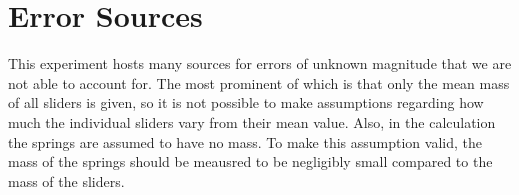 \section{Error Sources}
This experiment hosts many sources for errors of unknown magnitude that we are not able to account for.
The most prominent of which is that only the mean mass of all sliders is given, so it is not possible to make assumptions regarding how much the individual sliders vary from their mean value.
Also, in the calculation the springs are assumed to have no mass.
To make this assumption valid, the mass of the springs should be meausred to be negligibly small compared to the mass of the sliders.

